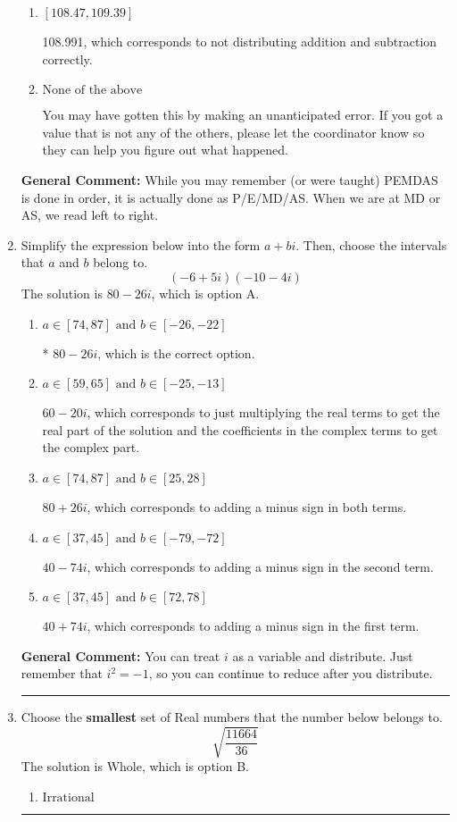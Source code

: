 \documentclass{extbook}[14pt]
\newcommand{\litem}[1]{\item #1

\rule{\textwidth}{0.4pt}}
\begin{document}
\begin{enumerate}
{\begin{enumerate}[label=\Alph*.]
* -86.167, which is the correct option.
\item \( [108.47, 109.39] \)

 108.991, which corresponds to not distributing addition and subtraction correctly.
\item \( \text{None of the above} \)

 You may have gotten this by making an unanticipated error. If you got a value that is not any of the others, please let the coordinator know so they can help you figure out what happened.
\end{enumerate}

\textbf{General Comment:} While you may remember (or were taught) PEMDAS is done in order, it is actually done as P/E/MD/AS. When we are at MD or AS, we read left to right.
}
\litem{
Simplify the expression below into the form $a+bi$. Then, choose the intervals that $a$ and $b$ belong to.
\[ (-6 + 5 i)(-10 - 4 i) \]The solution is \( 80 - 26 i \), which is option A.\begin{enumerate}[label=\Alph*.]
\item \( a \in [74, 87] \text{ and } b \in [-26, -22] \)

* $80 - 26 i$, which is the correct option.
\item \( a \in [59, 65] \text{ and } b \in [-25, -13] \)

 $60 - 20 i$, which corresponds to just multiplying the real terms to get the real part of the solution and the coefficients in the complex terms to get the complex part.
\item \( a \in [74, 87] \text{ and } b \in [25, 28] \)

 $80 + 26 i$, which corresponds to adding a minus sign in both terms.
\item \( a \in [37, 45] \text{ and } b \in [-79, -72] \)

 $40 - 74 i$, which corresponds to adding a minus sign in the second term.
\item \( a \in [37, 45] \text{ and } b \in [72, 78] \)

 $40 + 74 i$, which corresponds to adding a minus sign in the first term.
\end{enumerate}

\textbf{General Comment:} You can treat $i$ as a variable and distribute. Just remember that $i^2=-1$, so you can continue to reduce after you distribute.
}
\litem{
Choose the \textbf{smallest} set of Real numbers that the number below belongs to.
\[ \sqrt{\frac{11664}{36}} \]The solution is \( \text{Whole} \), which is option B.\begin{enumerate}[label=\Alph*.]
\item \( \text{Irrational} \)


\end{enumerate}}
\end{enumerate}
\end{document}

